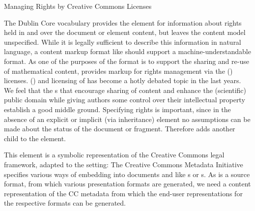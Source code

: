 
\begin{module}[id=cc]
\begin{omgroup}[id=creativecommons,short=Managing Rights]
                           {Managing Rights by Creative Commons Licenses}

The Dublin Core vocabulary provides the {} element for
information about rights held in and over the document or element content, but leaves the
content model unspecified. While it is legally sufficient to describe this information in
natural language, a content markup format like {\omdoc} should support a
machine-understandable format. As one of the purposes of the {\omdoc} format is to support
the sharing and re-use of mathematical content, {\omdoc} provides markup for rights
management via the {}
({}) licenses.   () and licensing of
{} has become a hotly debated topic in the last years. We
feel that the {s} that encourage sharing of content and
enhance the (scientific) public domain while giving authors some control over their
intellectual property establish a good middle ground. Specifying rights is important,
since in the absence of an explicit or implicit (via inheritance)
{} element no assumptions can be made about the status of the
document or fragment.  Therefore {\omdoc} adds another child to the {}
element.  

This {} element is a symbolic representation of the Creative
Commons legal framework, adapted to the {\omdoc} setting: The Creative Commons Metadata
Initiative specifies various ways of embedding {} into documents and
{} like {s} or
{s}. As {\omdoc} is a source format, from which various
presentation formats are generated, we need a content representation of the CC metadata
from which the end-user representations for the respective formats can be generated.


\end{omgroup}
\end{module}
